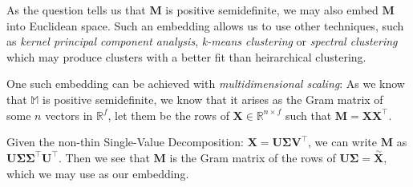 As the question tells us that $\mathbf{M}$ is positive semidefinite, we may also embed $\mathbf{M}$ into Euclidean space. Such an embedding allows us to use other techniques, such as \textit{kernel principal component analysis}, \textit{k-means clustering} or \textit{spectral clustering} which may produce clusters with a better fit than heirarchical clustering.

One such embedding can be achieved with \textit{multidimensional scaling}: As we know that $\mathbb{M}$ is positive semidefinite, we know that it arises as the Gram matrix of some $n$ vectors in $\mathbb{R}^f$, let them be the rows of $\mathbf{X}\in\mathbb{R}^{n\times f}$ such that $\mathbf{M} = \mathbf{X}\mathbf{X}^\intercal$.

Given the non-thin Single-Value Decomposition: $\mathbf{X} = \mathbf{U}\boldsymbol\Sigma\mathbf{V}^\intercal$, we can write $\mathbf{M}$ as $\mathbf{U}\boldsymbol\Sigma\boldsymbol\Sigma^\intercal\mathbf{U}^\intercal$. Then we see that $\mathbf{M}$ is the Gram matrix of the rows of $\mathbf{U}\boldsymbol\Sigma = \overset{\sim}{\mathbf{X}}$, which we may use as our embedding.
